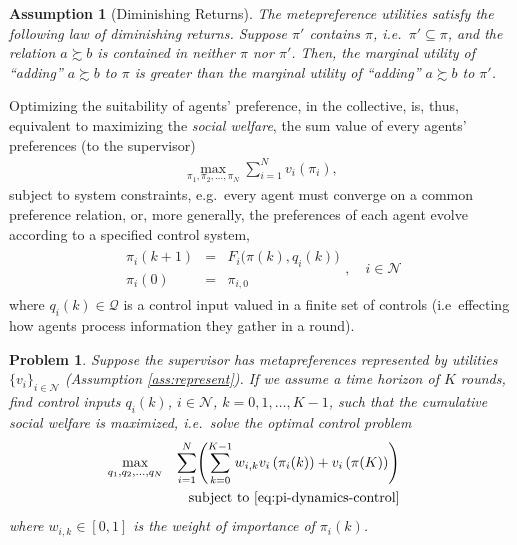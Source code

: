 \documentclass[conference]{ieeeconf}
\newcommand{\N}{\mathcal{N}}
\newcommand{\prefers}{\succsim}
\newcommand{\join}{\vee}
\renewcommand{\leq}{\leqslant}
\newtheorem{assumption}{Assumption}
\newtheorem{problem}{Problem}
\begin{document}
\begin{assumption}[Diminishing Returns]
    The metepreference utilities satisfy the following law of diminishing returns. Suppose $\pi'$ contains $\pi$, i.e.~$\pi' \subseteq \pi$, and the relation $a \prefers b$ is contained in neither $\pi$ nor $\pi'$. Then, the marginal utility of ``adding'' $a \prefers b$ to $\pi$ is greater than the marginal utility of ``adding'' $a \prefers b$ to $\pi'$.
\end{assumption}

Optimizing the suitability of agents' preference, in the collective, is, thus, equivalent to maximizing the \emph{social welfare}, the sum value of every agents' preferences (to the supervisor)
\begin{align}
    \max_{\pi_1,\pi_2,\dots,\pi_N} \sum_{i=1}^N v_i(\pi_i), \label{eq:dist-opt}
\end{align}
subject to system constraints, e.g.~every agent must converge on a common preference relation, or, more generally, the preferences of each agent evolve according to a specified control system,
\begin{align}
    \begin{aligned}
        \pi_i(k+1) &=& F_i \bigl( \pi(k), q_i(k) \bigr)  \\
        \pi_i(0) &=& \pi_{i,0}
    \end{aligned}, \quad i \in \N
    \label{eq:pi-dynamics-control}
\end{align}
where $q_i(k) \in \mathcal{Q}$ is a control input valued in a finite set of controls (i.e~effecting how agents process information they gather in a round).

\begin{problem} \label{prob:optimal-control}
    Suppose the supervisor has metapreferences represented by utilities $\{v_i\}_{i \in \N}$ (Assumption \ref{ass:represent}). If we assume a time horizon of $K$ rounds, find control inputs $q_i(k)$, $i \in \N$, $k=0,1,\dots,K-1$, such that the cumulative social welfare is maximized, i.e.~solve the optimal control problem
    \begin{align}
    \begin{aligned}
        \max_{q_1, q_2, \dots, q_N} && \sum_{i=1}^N \Biggl( \sum_{k=0}^{K-1} w_{i,k} v_i \left( \pi_i(k) \right) + v_i\left(\pi(K) \right) \Biggr) \\
        && \text{subject to \eqref{eq:pi-dynamics-control}}&& \\
    \end{aligned} \label{eq:optimal-control}
    \end{align}
where $w_{i,k} \in [0,1]$ is the weight of importance of $\pi_i(k)$.
\end{problem}
\end{document}
